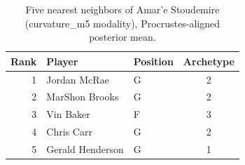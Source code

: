 \begin{table}[htbp]
  \centering\small
  \begin{tabular}{rllc}
    \toprule
    Rank & Player & Position & Archetype \\
    \midrule
    1 & Jordan McRae & G & 2 \\
    2 & MarShon Brooks & G & 2 \\
    3 & Vin Baker & F & 3 \\
    4 & Chris Carr & G & 2 \\
    5 & Gerald Henderson & G & 1 \\
    \bottomrule
  \end{tabular}
  \caption{Five nearest neighbors of Amar'e Stoudemire (curvature_m5 modality), Procrustes-aligned posterior mean.}
  \label{tab:Amar_e_Stoudemire_neighbors_curvature_m5}
\end{table}

